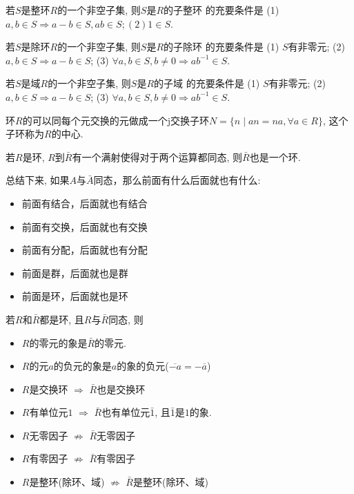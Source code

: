 \begin{Theorem}
若$S$是整环$R$的一个非空子集, 则$S$是$R$的子整环 的充要条件是 (1)$a, b \in S \Rightarrow a-b \in S, ab \in S; (2) \mathfrak{1} \in S$.
\end{Theorem}

\begin{Theorem}
若$S$是除环$R$的一个非空子集, 则$S$是$R$的子除环 的充要条件是 (1) $S$有非零元; (2) $a, b \in S \Rightarrow a-b \in S$; (3) $\forall a, b \in S, b \neq 0 \Rightarrow ab^{-1} \in S$.
\end{Theorem}

\begin{Theorem}
若$S$是域$R$的一个非空子集, 则$S$是$R$的子域 的充要条件是 (1) $S$有非零元; (2) $a, b \in S \Rightarrow a-b \in S$; (3) $\forall a, b \in S, b \neq 0 \Rightarrow ab^{-1} \in S$.
\end{Theorem}

\begin{Proposition}
环$R$的可以同每个元交换的元做成一个j交换子环$N = \{ n \mid a n = na, \forall a \in R\}$, 这个子环称为$R$的中心.
\end{Proposition}

\begin{Theorem}
若$R$是环, $R$到$\bar{R}$有一个满射使得对于两个运算都同态, 则$\bar{R}$也是一个环.
\end{Theorem}

\begin{Remark}
总结下来, 如果$A$与$\bar{A}$同态，那么前面有什么后面就也有什么:
\begin{itemize}
	\item 前面有结合，后面就也有结合
	\item 前面有交换，后面就也有交换
	\item 前面有分配，后面就也有分配
	\item 前面是群，后面就也是群
	\item 前面是环，后面就也是环
\end{itemize}
\end{Remark}

\begin{Theorem}
若$R$和$\bar{R}$都是环, 且$R$与$\bar{R}$同态, 则
\begin{itemize}
	\item $R$的零元的象是$\bar{R}$的零元.
	\item $R$的元$a$的负元的象是$a$的象的负元{($\overline{-a} = -\overline{a}$)}
	\item $R$是交换环 $\Rightarrow$ $\bar{R}$也是交换环
	\item $R$有单位元$\mathfrak{1}$ $\Rightarrow$ $\bar{R}$也有单位元$\bar{\mathfrak{1}}$, 且$\bar{\mathfrak{1}}$是$\mathfrak{1}$的象.
	\item $R$无零因子 $\not\Rightarrow$ $\bar{R}$无零因子
	\item $R$有零因子 $\not\Rightarrow$ $\bar{R}$有零因子
	\item $R$是整环(除环、域) $\not\Rightarrow$ $\bar{R}$是整环(除环、域)
\end{itemize}
\end{Theorem}

